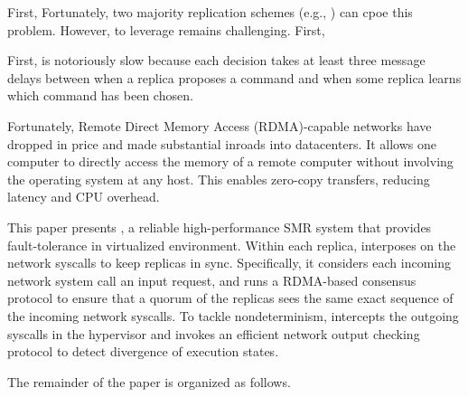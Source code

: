 First, 
Fortunately, two majority replication schemes (e.g., \paxos) can cpoe this problem. However, to 
leverage \paxos remains challenging. First, 






First, \paxos is notoriously slow because each decision takes at least three message delays between 
when a replica proposes a command and when some replica learns which command has been chosen.

Fortunately, Remote Direct Memory Access (RDMA)-capable networks have dropped in price and made 
substantial inroads into datacenters. It allows one computer to directly access the memory of 
a remote computer without involving the operating system at any host. This enables zero-copy 
transfers, reducing latency and CPU overhead.

This paper presents \xxx, a reliable high-performance SMR system that provides fault-tolerance 
in virtualized environment. Within each replica, \xxx interposes on the network syscalls to keep 
replicas in sync. Specifically, it considers each incoming network system call  an input request, 
and runs a RDMA-based \paxos consensus protocol to ensure that a quorum of the replicas sees the 
same exact sequence of the incoming network syscalls. To tackle nondeterminism, \xxx intercepts 
the outgoing syscalls in the hypervisor and invokes an efficient network output checking protocol 
to detect divergence of execution states.

The remainder of the paper is organized as follows.
